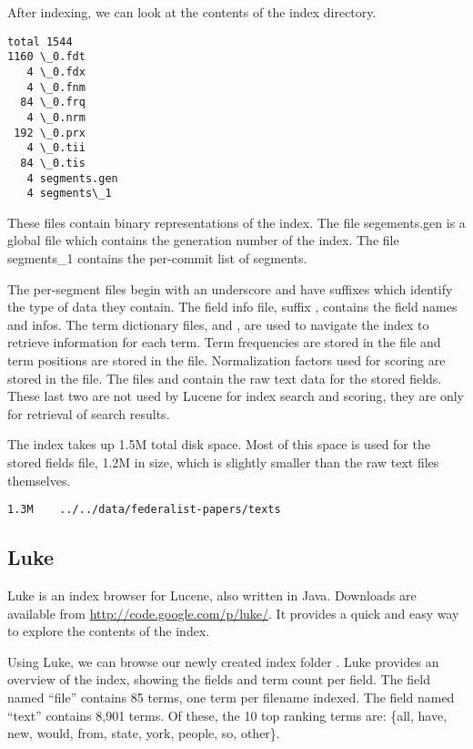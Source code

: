 After indexing, we can look at the contents of the index directory.
%
\begin{verbatim}
total 1544
1160 \_0.fdt
   4 \_0.fdx
   4 \_0.fnm
  84 \_0.frq
   4 \_0.nrm
 192 \_0.prx
   4 \_0.tii
  84 \_0.tis
   4 segments.gen
   4 segments\_1
\end{verbatim}

%
These files contain binary representations of the index.  
The file segements.gen is a global file which contains the generation number of the index.
The file segments\_1 contains the per-commit list of segments.

The per-segment files begin with an underscore and have suffixes
which identify the type of data they contain.
The field info file, suffix , contains the field names and infos.
The term dictionary files,  and , are used to navigate the index to
retrieve information for each term.
Term frequencies are stored in the  file
and term positions are stored in the  file.
Normalization factors used for scoring are stored in the  file.
The files  and  contain the raw text data for the stored fields.
These last two are not used by Lucene for index search and scoring, they are only
for retrieval of search results.

The index takes up 1.5M total disk space.
Most of this space is used for the stored fields file, 1.2M in size,
which is slightly smaller than the raw text files themselves.
\begin{verbatim}
1.3M	../../data/federalist-papers/texts
\end{verbatim}

\subsection{Luke}

Luke is an index browser for Lucene, also written in Java.
Downloads are available from \url{http://code.google.com/p/luke/}.
It provides a quick and easy way to explore the contents of the index.

Using Luke, we can browse our newly created index folder .
Luke provides an overview of the index, showing the fields and term count
per field.  The field named ``file'' contains 85 terms, one term per filename indexed.
The field named ``text'' contains 8,901 terms.  Of these, the 10 top ranking terms are:
\{all, have, new, would, from, state, york, people, so, other\}.

